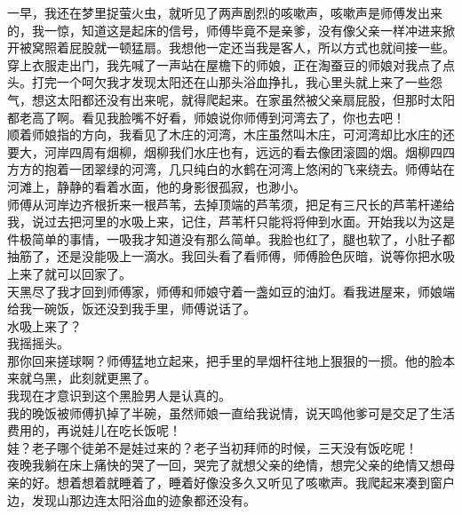 一早，我还在梦里捉萤火虫，就听见了两声剧烈的咳嗽声，咳嗽声是师傅发出来的，我一惊，知道这是起床的信号，师傅毕竟不是亲爹，没有像父亲一样冲进来掀开被窝照着屁股就一顿猛扇。我想他一定还当我是客人，所以方式也就间接一些。穿上衣服走出门，我先喊了一声站在屋檐下的师娘，正在淘蚕豆的师娘对我点了点头。打完一个呵欠我才发现太阳还在山那头浴血挣扎，我心里头就上来了一些怨气，想这太阳都还没有出来呢，就得爬起来。在家虽然被父亲扇屁股，但那时太阳都老高了啊。看见我脸嘴不好看，师娘说你师傅到河湾去了，你也去吧！
\\

顺着师娘指的方向，我看见了木庄的河湾，木庄虽然叫木庄，可河湾却比水庄的还要大，河岸四周有烟柳，烟柳我们水庄也有，远远的看去像团滚圆的烟。烟柳四四方方的抱着一团翠绿的河湾，几只纯白的水鹤在河湾上悠闲的飞来绕去。师傅站在河滩上，静静的看着水面，他的身影很孤寂，也渺小。
\\

师傅从河岸边齐根折来一根芦苇，去掉顶端的芦苇须，把足有三尺长的芦苇杆递给我，说过去把河里的水吸上来，记住，芦苇杆只能将将伸到水面。开始我以为这是件极简单的事情，一吸我才知道没有那么简单。我脸也红了，腿也软了，小肚子都抽筋了，还是没能吸上一滴水。我回头看了看师傅，师傅脸色灰暗，说等你把水吸上来了就可以回家了。
\\

天黑尽了我才回到师傅家，师傅和师娘守着一盏如豆的油灯。看我进屋来，师娘端给我一碗饭，饭还没到我手里，师傅说话了。
\\

水吸上来了？
\\

我摇摇头。
\\

那你回来搓球啊？师傅猛地立起来，把手里的旱烟杆往地上狠狠的一掼。他的脸本来就乌黑，此刻就更黑了。
\\

我现在才意识到这个黑脸男人是认真的。
\\

我的晚饭被师傅扒掉了半碗，虽然师娘一直给我说情，说天鸣他爹可是交足了生活费用的，再说娃儿在吃长饭呢！
\\

娃？老子哪个徒弟不是娃过来的？老子当初拜师的时候，三天没有饭吃呢！
\\

夜晚我躺在床上痛快的哭了一回，哭完了就想父亲的绝情，想完父亲的绝情又想母亲的好。想着想着就睡着了，睡着好像没多久又听见了咳嗽声。我爬起来凑到窗户边，发现山那边连太阳浴血的迹象都还没有。
\\

